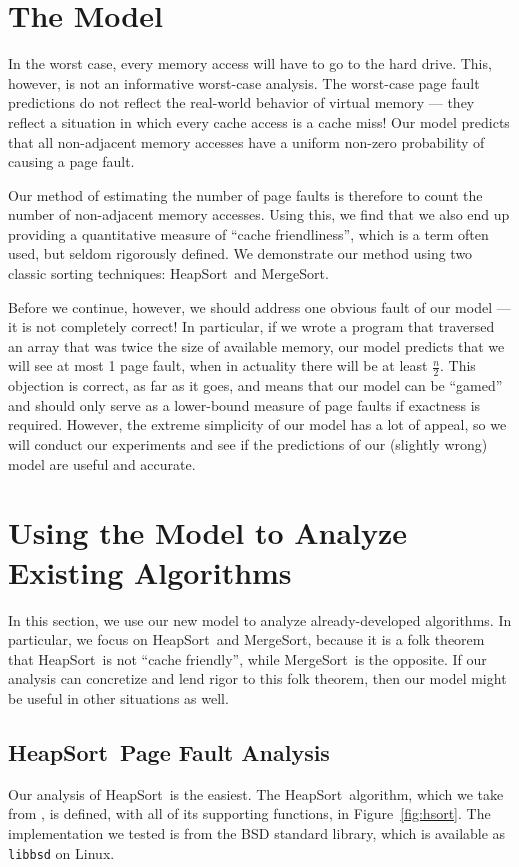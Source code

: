 \documentclass{acmtrans2m}
\newcommand{\heapsort}{{\sc HeapSort}}
\newcommand{\mergesort}{{\sc MergeSort}}
\begin{document}
\section{The Model}
\label{model}

In the worst case, every memory access will have to go to the hard drive.
This, however, is not an informative worst-case analysis.  The worst-case page
fault predictions do not reflect the real-world behavior of virtual memory ---
they reflect a situation in which every cache access is a cache miss! Our
model predicts that all non-adjacent memory accesses have a uniform non-zero probability of causing a page fault.

Our method of estimating the number of page faults is therefore to count the
number of non-adjacent memory accesses.  Using this, we find that we also end
up providing a quantitative measure of ``cache friendliness'', which is a term
often used, but seldom rigorously defined.  We demonstrate our method
using two classic sorting techniques: \heapsort\ and \mergesort.

Before we continue, however, we should address one obvious fault of our model --- it is not completely correct!  In particular, if we wrote a program that traversed an array that was twice the size of available memory, our model predicts that we will see at most 1 page fault, when in actuality there will be at least $\frac{n}{2}$.  This objection is correct, as far as it goes, and means that our model can be ``gamed'' and should only serve as a lower-bound measure of page faults if exactness is required.  However, the extreme simplicity of our model has a lot of appeal, so we will conduct our experiments and see if the predictions of our (slightly wrong) model are useful and accurate.

\section{Using the Model to Analyze Existing Algorithms}
\label{analysis}

In this section, we use our new model to analyze already-developed algorithms.  In particular, we focus on \heapsort\ and \mergesort, because it is a folk theorem that \heapsort\ is not ``cache friendly'', while \mergesort\ is the opposite.  If our analysis can concretize and lend rigor to this folk theorem, then our model might be useful in other situations as well.

\subsection{\heapsort\ Page Fault Analysis}
Our analysis of \heapsort\ is the easiest.  The \heapsort\ algorithm, which we
take from , is defined, with all of its
supporting functions, in Figure~\ref{fig:hsort}.  The implementation we tested
is from the BSD standard library, which is available as {\tt libbsd} on Linux.
\end{document}
